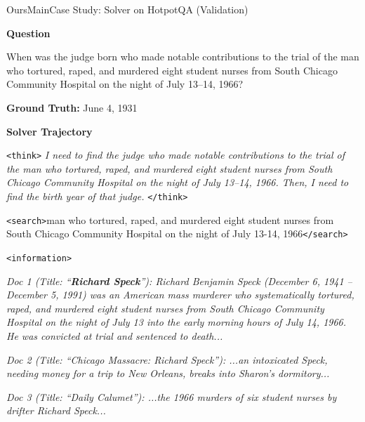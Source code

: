 \begin{casepagebox}{OursMain}{Case Study: Solver on HotpotQA (Validation)}
\noindent\colorbox{TagSearch!20}{\parbox{\dimexpr\linewidth-2\fboxsep}{\textcolor{TagSearch}{\textbf{Question}}}}

When was the judge born who made notable contributions to the trial of the man who tortured, raped, and murdered eight student nurses from South Chicago Community Hospital on the night of July 13--14, 1966?

\vspace{3mm}
\noindent\colorbox{TagAnswer!20}{\parbox{\dimexpr\linewidth-2\fboxsep}{\textcolor{TagAnswer}{\textbf{Ground Truth: }} June 4, 1931}}

\vspace{3mm}
\noindent\colorbox{OursMain!20}{\parbox{\dimexpr\linewidth-2\fboxsep}{\textcolor{OursMain}{\textbf{Solver Trajectory}}}}

\begin{thinkpanel}
\textcolor{TagThink}{\texttt{<think>}} \textit{I need to find the judge who made notable contributions to the trial of the man who tortured, raped, and murdered eight student nurses from South Chicago Community Hospital on the night of July 13--14, 1966. Then, I need to find the birth year of that judge.} \textcolor{TagThink}{\texttt{</think>}}
\end{thinkpanel}

\textcolor{TagSearch}{\texttt{<search>}}man who tortured, raped, and murdered eight student nurses from South Chicago Community Hospital on the night of July 13-14, 1966\textcolor{TagSearch}{\texttt{</search>}}

\textcolor{TagInfo}{\texttt{<information>}}

\textit{Doc 1 (Title: ``\colorbox{yellow!30}{\textbf{Richard Speck}}''): Richard Benjamin Speck (December 6, 1941 -- December 5, 1991) was an American mass murderer who \colorbox{yellow!30}{systematically tortured, raped, and murdered eight student nurses} from South Chicago Community Hospital on the night of July 13 into the early morning hours of July 14, 1966. He was convicted at trial and sentenced to death...}

\textit{Doc 2 (Title: ``Chicago Massacre: Richard Speck''): ...an intoxicated Speck, needing money for a trip to New Orleans, breaks into Sharon's dormitory...}

\textit{Doc 3 (Title: ``Daily Calumet''): ...the 1966 murders of six student nurses by drifter Richard Speck...}


\end{casepagebox}
